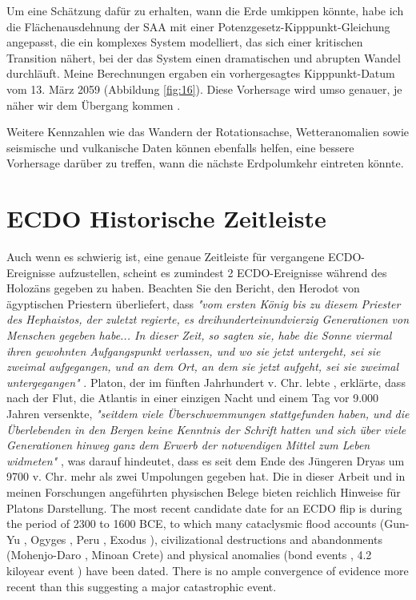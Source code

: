 \documentclass[10pt,twocolumn,letterpaper]{article}
\begin{document}
Um eine Schätzung dafür zu erhalten, wann die Erde umkippen könnte, habe ich die Flächenausdehnung der SAA mit einer Potenzgesetz-Kipppunkt-Gleichung angepasst, die ein komplexes System modelliert, das sich einer kritischen Transition nähert, bei der das System einen dramatischen und abrupten Wandel durchläuft. Meine Berechnungen ergaben ein vorhergesagtes Kipppunkt-Datum vom 13. März 2059 (Abbildung \ref{fig:16}). Diese Vorhersage wird umso genauer, je näher wir dem Übergang kommen \cite{136}.

Weitere Kennzahlen wie das Wandern der Rotationsachse, Wetteranomalien sowie seismische und vulkanische Daten können ebenfalls helfen, eine bessere Vorhersage darüber zu treffen, wann die nächste Erdpolumkehr eintreten könnte.

\section{ECDO Historische Zeitleiste}

Auch wenn es schwierig ist, eine genaue Zeitleiste für vergangene ECDO-Ereignisse aufzustellen, scheint es zumindest 2 ECDO-Ereignisse während des Holozäns gegeben zu haben. Beachten Sie den Bericht, den Herodot von ägyptischen Priestern überliefert, dass \textit{"vom ersten König bis zu diesem Priester des Hephaistos, der zuletzt regierte, es dreihunderteinundvierzig Generationen von Menschen gegeben habe... In dieser Zeit, so sagten sie, habe die Sonne viermal ihren gewohnten Aufgangspunkt verlassen, und wo sie jetzt untergeht, sei sie zweimal aufgegangen, und an dem Ort, an dem sie jetzt aufgeht, sei sie zweimal untergegangen"} \cite{32}. Platon, der im fünften Jahrhundert v. Chr. lebte \cite{111}, erklärte, dass nach der Flut, die Atlantis in einer einzigen Nacht und einem Tag vor 9.000 Jahren versenkte, \textit{"seitdem viele Überschwemmungen stattgefunden haben, und die Überlebenden in den Bergen keine Kenntnis der Schrift hatten und sich über viele Generationen hinweg ganz dem Erwerb der notwendigen Mittel zum Leben widmeten"} \cite{112}, was darauf hindeutet, dass es seit dem Ende des Jüngeren Dryas um 9700 v. Chr. mehr als zwei Umpolungen gegeben hat. Die in dieser Arbeit und in meinen Forschungen angeführten physischen Belege \cite{2} bieten reichlich Hinweise für Platons Darstellung.
The most recent candidate date for an ECDO flip is during the period of 2300 to 1600 BCE, to which many cataclysmic flood accounts (Gun-Yu \cite{113,114,115}, Ogyges \cite{116,117}, Peru \cite{118,119}, Exodus \cite{120}), civilizational destructions and abandonments (Mohenjo-Daro \cite{121}, Minoan Crete\cite{100,101}) and physical anomalies (bond events \cite{122}, 4.2 kiloyear event \cite{90}) have been dated. There is no ample convergence of evidence more recent than this suggesting a major catastrophic event.
\end{document}
